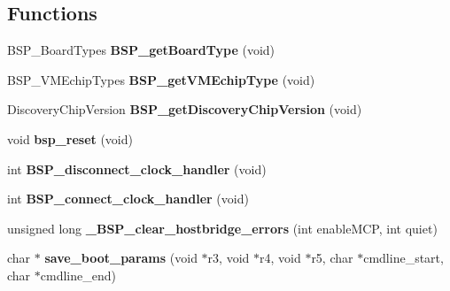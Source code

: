\subsection*{Functions}
\begin{DoxyCompactItemize}
\item 
\mbox{\label{group__RTEMSBSPsPowerPCMVME5500_ga55affdf947d9dd4e5a634bcf7b5ce2cb}} 
B\+S\+P\+\_\+\+Board\+Types {\bfseries B\+S\+P\+\_\+get\+Board\+Type} (void)
\item 
\mbox{\label{group__RTEMSBSPsPowerPCMVME5500_ga42ab56fd4974b8fd8cfff011c5c4041a}} 
B\+S\+P\+\_\+\+V\+M\+Echip\+Types {\bfseries B\+S\+P\+\_\+get\+V\+M\+Echip\+Type} (void)
\item 
\mbox{\label{group__RTEMSBSPsPowerPCMVME5500_gae60fa7cf14773829ec2783d482bf67c8}} 
Discovery\+Chip\+Version {\bfseries B\+S\+P\+\_\+get\+Discovery\+Chip\+Version} (void)
\item 
\mbox{\label{group__RTEMSBSPsPowerPCMVME5500_gaee99733067120706ee7d3395ea225dfb}} 
void {\bfseries bsp\+\_\+reset} (void)
\item 
\mbox{\label{group__RTEMSBSPsPowerPCMVME5500_ga5b6f7a1b73b76ef80251fd770905d0c1}} 
int {\bfseries B\+S\+P\+\_\+disconnect\+\_\+clock\+\_\+handler} (void)
\item 
\mbox{\label{group__RTEMSBSPsPowerPCMVME5500_ga7e99fec6e3bd9986094a2de9cc0b110a}} 
int {\bfseries B\+S\+P\+\_\+connect\+\_\+clock\+\_\+handler} (void)
\item 
\mbox{\label{group__RTEMSBSPsPowerPCMVME5500_ga9365175934c534169a41c05950c05fcd}} 
unsigned long {\bfseries \+\_\+\+B\+S\+P\+\_\+clear\+\_\+hostbridge\+\_\+errors} (int enable\+M\+CP, int quiet)
\item 
\mbox{\label{group__RTEMSBSPsPowerPCMVME5500_ga127266abfcf87d5e48d649092e2951e9}} 
char $\ast$ {\bfseries save\+\_\+boot\+\_\+params} (void $\ast$r3, void $\ast$r4, void $\ast$r5, char $\ast$cmdline\+\_\+start, char $\ast$cmdline\+\_\+end)

\end{DoxyCompactItemize}
